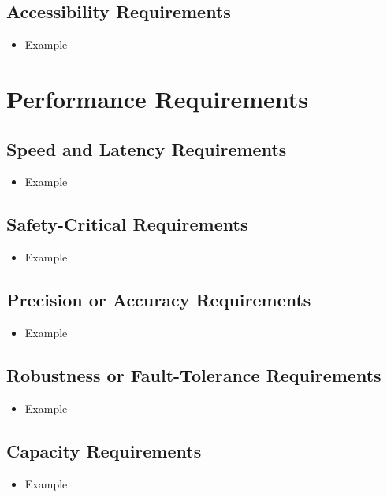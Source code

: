 \documentclass[12pt]{article}
\begin{document}
  \subsection{Accessibility Requirements}
    \begin{itemize}
      \item Example
    \end{itemize}

\section{Performance Requirements}
  \subsection{Speed and Latency Requirements}
    \begin{itemize}
      \item Example
    \end{itemize}

  \subsection{Safety-Critical Requirements}
    \begin{itemize}
      \item Example
    \end{itemize}

  \subsection{Precision or Accuracy Requirements}
    \begin{itemize}
      \item Example
    \end{itemize}

  \subsection{Robustness or Fault-Tolerance Requirements}
    \begin{itemize}
      \item Example
    \end{itemize}

  \subsection{Capacity Requirements}
    \begin{itemize}
      \item Example
    \end{itemize}
\end{document}
